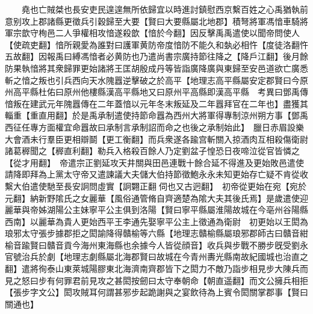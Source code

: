 　　堯也亡賊桀也長安吏民遑遑無所依歸宜以時進討鎮慰西京繫百姓之心禹猶執前意别攻上郡諸縣更徵兵引穀歸至大要【賢曰大要縣屬北地郡】積弩將軍馮愔車騎將軍宗歆守栒邑二人爭權相攻愔遂殺歆【愔於今翻】因反擊禹禹遣使以聞帝問使人【使疏吏翻】愔所親愛為誰對曰護軍黄防帝度愔防不能久和埶必相忤【度徒洛翻忤五故翻】因報禹曰縛馮愔者必黄防也乃遣尚書宗廣持節往降之【降戶江翻】後月餘防果執愔將其衆歸罪更始諸將王匡胡殷成丹等皆詣廣降廣與東歸至安邑道欲亡廣悉斬之愔之叛也引兵西向天水隗囂逆擊破之於高平【地理志高平縣屬安定郡賢曰今原州高平縣杜佑曰原州他樓縣漢高平縣地又曰原州平高縣即漢高平縣　考異曰鄧禹傳愔叛在建武元年隗囂傳在二年蓋愔以元年冬末叛延及二年囂拜官在二年也】盡獲其輜重【重直用翻】於是禹承制遣使持節命囂為西州大將軍得專制涼州朔方事【鄧禹西征任專方面權宜命囂故曰承制言承制詔而命之也後之承制始此】　臘日赤眉設樂大會酒未行羣臣更相辯鬬【更工衡翻】而兵衆遂各踰宫斬關入掠酒肉互相殺傷衛尉諸葛稺聞之【稺直利翻】勒兵入格殺百餘人乃定劉盆子惶恐日夜啼泣從官皆憐之【從才用翻】　帝遣宗正劉延攻天井關與田邑連戰十餘合延不得進及更始敗邑遣使請降即拜為上黨太守帝又遣諫議大夫儲大伯持節徵鮑永永未知更始存亡疑不肯從收繫大伯遣使馳至長安詗問虛實【詗翾正翻伺也又古迥翻】　初帝從更始在宛【宛於元翻】納新野隂氏之女麗華【風俗通管脩自齊適楚為隂大夫其後氏焉】是歲遣使迎麗華與帝姊湖陽公主妹寧平公主俱到洛陽【賢曰寧平縣屬淮陽故城在今亳州谷陽縣西南】以麗華為貴人更始西平王李通先娶寧平公主上徵通為衛尉　初更始以王閎為琅邪太守張步據郡拒之閎諭降得贛榆等六縣【地理志贛榆縣屬琅邪郡師古曰贛音紺榆音踰賢曰贛音貢今海州東海縣也余據今人皆從顔音】收兵與步戰不勝步旣受劉永官號治兵於劇【地理志劇縣屬北海郡賢曰故城在今青州夀光縣南故紀國城也治直之翻】遣將徇泰山東萊城陽膠東北海濟南齊郡皆下之閎力不敵乃詣步相見步大陳兵而見之怒曰步有何罪君前見攻之甚閎按劒曰太守奉朝命【朝直遥翻】而文公擁兵相拒【張步字文公】閎攻賊耳何謂甚邪步起跪謝與之宴飲待為上賓令閎關掌郡事【賢曰關通也】

